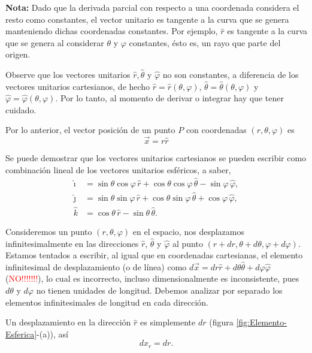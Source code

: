 \textbf{Nota:} Dado que la derivada parcial con respecto a una coordenada considera el resto como constantes, el vector unitario es tangente a la curva que se genera manteniendo dichas coordenadas constantes. Por ejemplo, $\hat{r}$ es tangente a la curva que se genera al considerar $\theta$ y $\varphi$ constantes, ésto es, un rayo que parte del origen.

Observe que los vectores unitarios $\hat{r}, \hat{\theta}$ y $\hat{\varphi}$ no son constantes, a diferencia de los vectores unitarios cartesianos, de hecho $\hat{r} = \hat{r}(\theta,\varphi)$, $\hat{\theta} = \hat{\theta}(\theta,\varphi)$ y $\hat{\varphi} = \hat{\varphi}(\theta,\varphi)$. Por lo tanto, al momento de derivar o integrar hay que tener cuidado.

Por lo anterior, el vector posición de un punto $P$ con coordenadas $(r, \theta, \varphi)$ es 
\begin{equation*}
\vec{x} = r \hat{r}
\end{equation*}

Se puede demostrar que los vectores unitarios cartesianos se pueden escribir como combinación lineal de los vectores unitarios esféricos, a saber,
\begin{align*}
    \hat{\imath} &= \sin \theta \cos \varphi \,\hat{r} + \cos \theta \cos \varphi \,\hat{\theta} - \sin \varphi \,\hat{\varphi},\\
    \hat{\jmath} &= \sin \theta \sin\varphi \,\hat{r} + \cos \theta \sin \varphi \,\hat{\theta} + \cos \varphi \,\hat{\varphi}, \\
    \hat{k} &= \cos \theta \,\hat{r} - \sin \theta \,\hat{\theta}.
\end{align*}

Consideremos un punto $(r,\theta, \varphi)$ en el espacio, nos desplazamos infinitesimalmente en las direcciones $\hat{r}$, $\hat{\theta}$ y $\hat{\varphi}$ al punto $(r + dr, \theta + d\theta, \varphi + d\varphi)$. Estamos tentados a escribir, al igual que en coordenadas cartesianas, el elemento infinitesimal de desplazamiento (o de línea) como $d \Vec{x} = dr \hat{r} + d\theta \hat{\theta} + d\varphi \hat{\varphi}$ (\textcolor{red}{NO!!!!!!!}), lo cual es incorrecto, incluso dimensionalmente es inconsistente, pues $d\theta$ y $d\varphi$ no tienen unidades de longitud. Debemos analizar por separado los elementos infinitesimales de longitud en cada dirección.

Un desplazamiento en la dirección $\hat{r}$ es simplemente $dr$ (figura \ref{fig:Elemento-Esferica}-(a)), así 
$$dx_r = dr.$$

